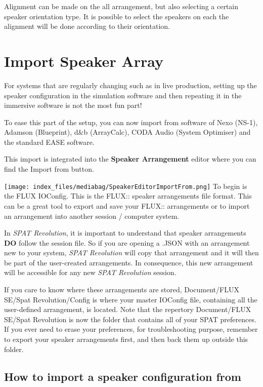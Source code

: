 \documentclass[
  letterpaper,
  DIV=11,
  numbers=noendperiod]{scrreport}
\begin{document}
Alignment can be made on the all arrangement, but also selecting a
certain speaker orientation type. It is possible to select the speakers
on each the alignment will be done according to their orientation.

\hypertarget{import-speaker-array}{%
\chapter{Import Speaker Array}\label{import-speaker-array}}

For systems that are regularly changing such as in live production,
setting up the speaker configuration in the simulation software and then
repeating it in the immersive software is not the most fun part!

To ease this part of the setup, you can now import from software of Nexo
(NS-1), Adamson (Blueprint), d\&b (ArrayCalc), CODA Audio (System
Optimiser) and the standard EASE software.

This import is integrated into the \textbf{Speaker Arrangement} editor
where you can find the Import from button.

\texttt{[image: index\_files/mediabag/SpeakerEditorImportFrom.png]} To
begin is the FLUX IOConfig. This is the FLUX:: speaker arrangements file
format. This can be a great tool to export and save your FLUX::
arrangements or to import an arrangement into another session / computer
system.

In \emph{SPAT Revolution}, it is important to understand that speaker
arrangements \textbf{DO} follow the session file. So if you are opening
a .JSON with an arrangement new to your system, \emph{SPAT Revolution}
will copy that arrangement and it will then be part of the user-created
arrangements. In consequence, this new arrangement will be accessible
for any new \emph{SPAT Revolution} session.

If you care to know where these arrangements are stored, Document/FLUX
SE/Spat Revolution/Config is where your master IOConfig file, containing
all the user-defined arrangement, is located. Note that the repertory
Document/FLUX SE/Spat Revolution is now the folder that contains all of
your SPAT preferences. If you ever need to erase your preferences, for
troubleshooting purpose, remember to export your speaker arrangements
first, and then back them up outside this folder.

\hypertarget{how-to-import-a-speaker-configuration-from}{%
\section{How to import a speaker configuration
from}\label{how-to-import-a-speaker-configuration-from}}
\end{document}
